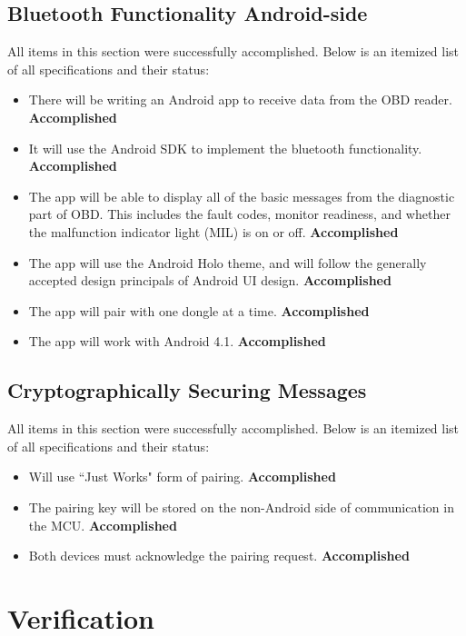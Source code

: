 \documentclass[12pt,letterpaper]{article}
\begin{document}
\subsection{Bluetooth Functionality Android-side}
All items in this section were successfully accomplished. Below is an itemized list of all specifications and their status:

\begin{itemize}
	\item There will be writing an Android app to receive data from the OBD reader. \textbf{Accomplished}
	\item It will use the Android SDK to implement the bluetooth functionality. \textbf{Accomplished}
	\item The app will be able to display all of the basic messages from the diagnostic part of OBD. This includes the fault codes, monitor readiness, and whether the malfunction indicator light (MIL) is on or off. \textbf{Accomplished}
	\item The app will use the Android Holo theme, and will follow the generally accepted design principals of Android UI design. \textbf{Accomplished}
	\item The app will pair with one dongle at a time. \textbf{Accomplished}
	\item The app will work with Android 4.1. \textbf{Accomplished}

\end{itemize}

\subsection{Cryptographically Securing Messages}
All items in this section were successfully accomplished. Below is an itemized list of all specifications and their status:

\begin{itemize}
	\item Will use ``Just Works" form of pairing. \textbf{Accomplished}
	\item The pairing key will be stored on the non-Android side of communication in the MCU. \textbf{Accomplished}
	\item Both devices must acknowledge the pairing request. \textbf{Accomplished}
\end{itemize} 


\newpage

\section{Verification}
\end{document}
